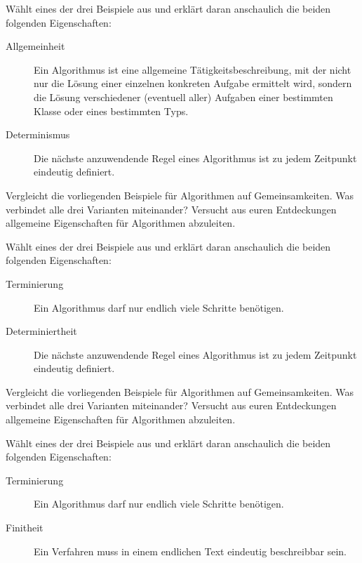 \documentclass[11pt, a5paper, landscape]{arbeitsblatt}
\begin{document}
\begin{aufgabe}
Wählt eines der drei Beispiele aus und erklärt daran anschaulich die beiden
folgenden Eigenschaften:
\begin{description}
	\item[Allgemeinheit] Ein Algorithmus ist eine allgemeine Tätigkeitsbeschreibung, mit der nicht nur
		die Lösung einer einzelnen konkreten Aufgabe ermittelt wird, sondern die Lösung
		verschiedener (eventuell aller) Aufgaben einer bestimmten Klasse oder eines
		bestimmten Typs.
	\item[Determinismus] Die nächste anzuwendende Regel eines Algorithmus ist zu jedem Zeitpunkt
		eindeutig definiert.
\end{description}
\end{aufgabe}

\newpage\setcounter{aufgabe}{0}
\ReiheTitel*

\begin{aufgabe}
Vergleicht die vorliegenden Beispiele für Algorithmen auf Gemeinsamkeiten. Was
verbindet alle drei Varianten miteinander? Versucht aus euren Entdeckungen
allgemeine Eigenschaften für Algorithmen abzuleiten.
\end{aufgabe}

\begin{aufgabe}
Wählt eines der drei Beispiele aus und erklärt daran anschaulich die beiden
folgenden Eigenschaften:
\begin{description}
	\item[Terminierung] Ein Algorithmus darf nur endlich viele Schritte benötigen.
	\item[Determiniertheit] Die nächste anzuwendende Regel eines Algorithmus ist zu jedem Zeitpunkt
		eindeutig definiert.
\end{description}
\end{aufgabe}

\newpage\setcounter{aufgabe}{0}
\ReiheTitel*

\begin{aufgabe}
Vergleicht die vorliegenden Beispiele für Algorithmen auf Gemeinsamkeiten. Was
verbindet alle drei Varianten miteinander? Versucht aus euren Entdeckungen
allgemeine Eigenschaften für Algorithmen abzuleiten.
\end{aufgabe}

\begin{aufgabe}
Wählt eines der drei Beispiele aus und erklärt daran anschaulich die beiden
folgenden Eigenschaften:
\begin{description}
	\item[Terminierung] Ein Algorithmus darf nur endlich viele Schritte benötigen.
	\item[Finitheit] Ein Verfahren muss in einem endlichen Text eindeutig beschreibbar sein.
\end{description}
\end{aufgabe}
\end{document}
